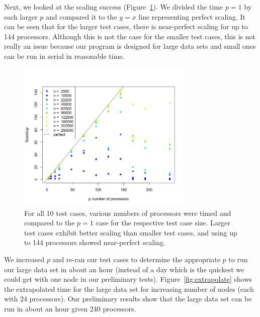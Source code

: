 Next, we looked at the scaling success (Figure~\ref{fig:scaling}). We divided the time $p=1$ by each larger $p$ and compared it to the $y=x$ line representing perfect scaling. It can be seen that for the larger test cases, there is near-perfect scaling for up to 144 processors. Although this is not the case for the smaller test cases, this is not really an issue because our program is designed for large data sets and small ones can be run in serial in reasonable time. 

\begin{figure}[!h]
   \centering
   \includegraphics[width=0.75\textwidth]{./fig/speedup.png} %
   \caption{For all 10 test cases, various numbers of processors were timed and compared to the $p=1$ case for the respective test case size. Larger test cases exhibit better scaling than smaller test cases, and using up to 144 processors showed near-perfect scaling.}
   \label{fig:scaling}
\end{figure}

We increased $p$ and re-ran our test cases to determine the appropriate $p$ to run our large data set in about an hour (instead of a day which is the quickest we could get with one node in our preliminary tests). Figure~\ref{fig:extrapolate} shows the extrapolated time for the large data set for  increasing number of nodes (each with 24 processors). Our preliminary results show that the large data set can be run in about an hour given 240 processors.

